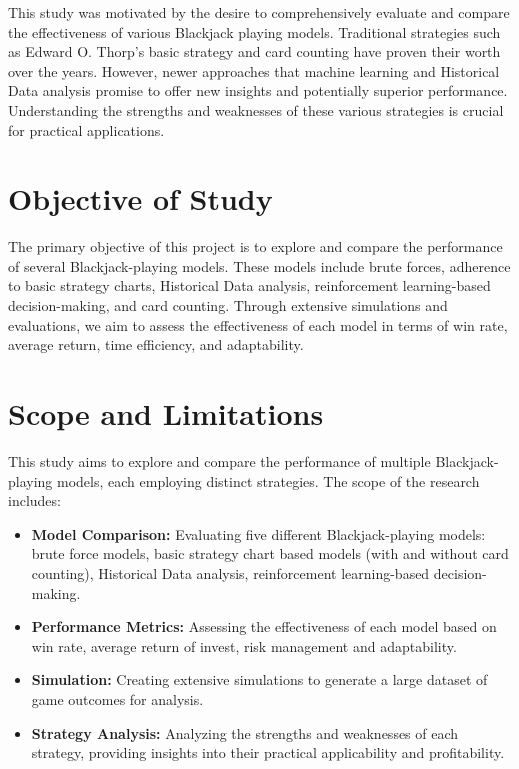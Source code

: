 \documentclass[a4paper,12pt]{report}
\begin{document}
This study was motivated by the desire to comprehensively evaluate and compare the effectiveness of various Blackjack playing models. Traditional strategies such as Edward O. Thorp's basic strategy and card counting have proven their worth over the years. However, newer approaches that machine learning and Historical Data analysis promise to offer new insights and potentially superior performance. Understanding the strengths and weaknesses of these various strategies is crucial for practical applications.

\section{Objective of Study} The primary objective of this project is to explore and compare the performance of several Blackjack-playing models. These models include brute forces, adherence to basic strategy charts, Historical Data analysis, reinforcement learning-based decision-making, and card counting. Through extensive simulations and evaluations, we aim to assess the effectiveness of each model in terms of win rate, average return, time efficiency, and adaptability.

\section{Scope and Limitations}
This study aims to explore and compare the performance of multiple Blackjack-playing models, each employing distinct strategies. The scope of the research includes:

\begin{itemize}
\item \textbf{Model Comparison:} Evaluating five different Blackjack-playing models: brute force models, basic strategy chart based models (with and without card counting), Historical Data analysis, reinforcement learning-based decision-making.
\item \textbf{Performance Metrics:} Assessing the effectiveness of each model based on win rate, average return of invest, risk management and adaptability.
\item \textbf{Simulation:} Creating extensive simulations to generate a large dataset of game outcomes for analysis.
\item \textbf{Strategy Analysis:} Analyzing the strengths and weaknesses of each strategy, providing insights into their practical applicability and profitability.
\end{itemize} 
\end{document}

